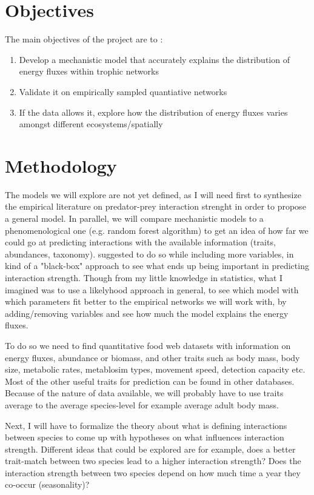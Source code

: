 \documentclass[12pt]{article}
\begin{document}
\section{Objectives}
The main objectives of the project are to :
\begin{enumerate}
    \item Develop a mechanistic model that accurately explains the distribution of energy fluxes within trophic networks
    \item Validate it on empirically sampled quantiative networks 
    \item If the data allows it, explore how the distribution of energy fluxes varies amongst different ecosystems/spatially
\end{enumerate}

\section{Methodology}
The models we will explore are not yet defined, as I will need first to synthesize the empirical literature on predator-prey interaction strenght in order to propose a general model. In parallel, we will compare mechanistic models to a phenomenological one (e.g. random forest algorithm) to get an idea of how far we could go at predicting interactions with the available information (traits, abundances, taxonomy). \citet{Brose2019PreTra} suggested to do so while including more variables, in kind of a "black-box" approach to see what ends up being important in predicting interaction strength. Though from my little knowledge in statistics, what I imagined was to use a likelyhood approach in general, to see which model with which parameters fit better to the empirical networks we will work with, by adding/removing variables and see how much the model explains the energy fluxes.

To do so we need to find quantitative food web datasets with information on energy fluxes, abundance or biomass, and other traits such as body mass, body size, metabolic rates, metablosim types, movement speed, detection capacity etc. Most of the other useful traits for prediction can be found in other databases. Because of the nature of data available, we will probably have to use traits average to the average species-level for example average adult body mass. 

Next, I will have to formalize the theory about what is defining interactions between species to come up with hypotheses on what influences interaction strength. Different ideas that could be explored are for example, does a better trait-match between two species lead to a higher interaction strength? Does the interaction strength between two species depend on how much time a year they co-occur (seasonality)?
\end{document}
